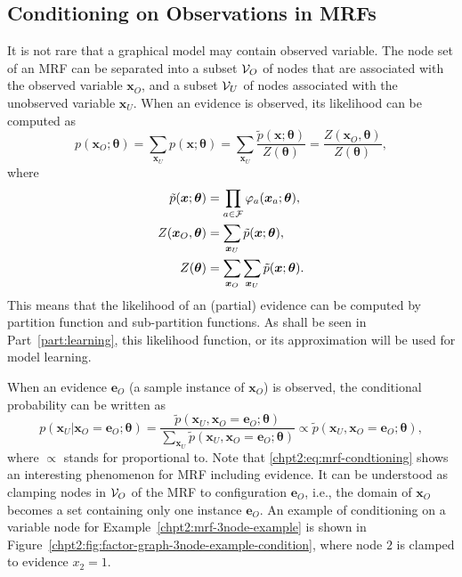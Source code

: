 \subsection{Conditioning on Observations in MRFs}
It is not rare that a graphical model may contain observed variable. The node set of an MRF can be separated into a subset $\mathcal{V}_O$ of nodes that are associated with the observed variable $\bm{x}_O$, and a subset $\mathcal{V}_U$ of nodes associated with the unobserved variable $\bm{x}_U$. When an evidence is observed, its likelihood can be computed as
\begin{equation}
  p(\bm{x}_O;\bm{\theta}) = \sum_{\bm{x}_U} p(\bm{x};\bm{\theta}) =\sum_{\bm{x}_U}\frac{\tilde{p}(\bm{x}; \bm{\theta})}{Z(\bm{\theta})} = \frac{Z(\bm{x}_O,\bm{\theta})}{Z(\bm{\theta})},
\end{equation}
where 
\begin{align}
  \tilde{p}(\bm{x}; \bm{\theta}) &= \prod_{a \in \mathcal{F}} \varphi_{a}(\bm{x}_{a};\bm{\theta}), \nonumber \\
  Z(\bm{x}_O, \bm{\theta}) &= \sum_{\bm{x}_U} \tilde{p}(\bm{x}; \bm{\theta}), \nonumber \\
  Z(\bm{\theta}) &= \sum_{\bm{x}_O}\sum_{\bm{x}_U} \tilde{p}(\bm{x}; \bm{\theta}).
\end{align}
This means that the likelihood of an (partial) evidence can be computed by partition function and sub-partition functions. As shall be seen in Part~\ref{part:learning}, this likelihood function, or its approximation will be used for model learning.

 When an evidence $\bm{e}_O$ (a sample instance of $\bm{x}_O$) is observed, the conditional probability can be written as
\begin{equation}\label{chpt2:eq:mrf-condtioning}
  p(\bm{x}_U|\bm{x}_O=\bm{e}_O;\bm{\theta}) = \frac{\tilde{p}(\bm{x}_U, \bm{x}_O = \bm{e}_O; \bm{\theta})}{\sum_{\bm{x}_U}\tilde{p}(\bm{x}_U, \bm{x}_O = \bm{e}_O; \bm{\theta})} \propto \tilde{p}(\bm{x}_U, \bm{x}_O = \bm{e}_O; \bm{\theta}),
\end{equation}
where $\propto$ stands for proportional to. Note that \eqref{chpt2:eq:mrf-condtioning} shows an interesting phenomenon for MRF including evidence. It can be understood as clamping nodes in $\mathcal{V}_O$ of the MRF to configuration $\bm{e}_O$, i.e., the domain of $\bm{x}_O$ becomes a set containing only one instance $\bm{e}_O$. An example of conditioning on a variable node for Example~\ref{chpt2:mrf-3node-example} is shown in Figure~\ref{chpt2:fig:factor-graph-3node-example-condition}, where node $2$ is clamped to evidence $x_2=1$.



